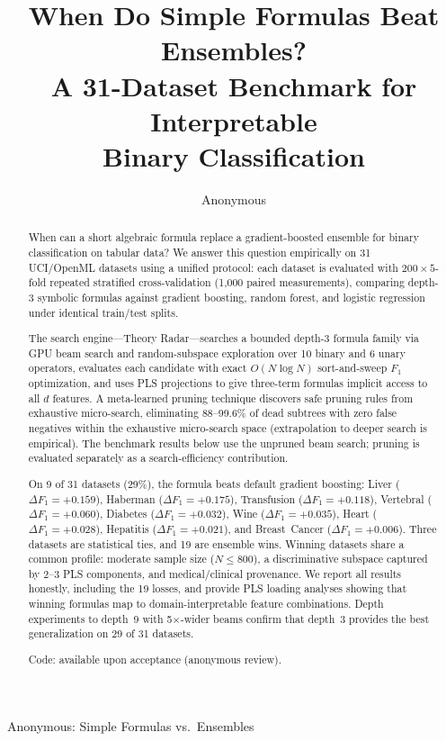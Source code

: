\documentclass[journal]{IEEEtran}
\begin{document}
\title{When Do Simple Formulas Beat Ensembles?\\
A 31-Dataset Benchmark for Interpretable\\Binary Classification}

\author{Anonymous}

{Anonymous: Simple Formulas vs.\ Ensembles}

\maketitle

\begin{abstract}
When can a short algebraic formula replace a gradient-boosted
ensemble for binary classification on tabular data?  We answer this
question empirically on 31 UCI/OpenML datasets using a unified
protocol: each dataset is evaluated with $200 \times 5$-fold
repeated stratified cross-validation (1{,}000 paired measurements),
comparing depth-3 symbolic formulas against gradient boosting,
random forest, and logistic regression under identical train/test
splits.

The search engine---Theory Radar---searches a bounded depth-3
formula family via GPU beam search and random-subspace exploration
over 10 binary and 6 unary operators, evaluates each candidate with
exact $O(N \log N)$ sort-and-sweep $F_1$ optimization, and uses PLS
projections to give three-term formulas implicit access to all $d$
features.  A meta-learned pruning
technique discovers safe pruning rules from exhaustive micro-search,
eliminating 88--99.6\% of dead subtrees with zero false negatives
within the exhaustive micro-search space (extrapolation to deeper
search is empirical).  The benchmark results below use the unpruned
beam search; pruning is evaluated separately as a search-efficiency
contribution.

On 9 of 31 datasets (29\%), the formula beats default
gradient boosting: Liver ($\Delta F_1 = {+}0.159$), Haberman
($\Delta F_1 = {+}0.175$), Transfusion ($\Delta F_1 = {+}0.118$),
Vertebral ($\Delta F_1 = {+}0.060$), Diabetes
($\Delta F_1 = {+}0.032$), Wine ($\Delta F_1 = {+}0.035$), Heart
($\Delta F_1 = {+}0.028$), Hepatitis ($\Delta F_1 = {+}0.021$),
and Breast~Cancer ($\Delta F_1 = {+}0.006$).  Three datasets are
statistical ties, and 19 are ensemble wins.  Winning datasets share
a common profile: moderate sample size ($N \leq 800$), a
discriminative subspace captured by 2--3 PLS components, and
medical/clinical provenance.  We report all results honestly,
including the 19 losses, and provide PLS loading analyses showing
that winning formulas map to domain-interpretable feature
combinations.  Depth experiments to depth~9 with 5$\times$-wider
beams confirm that depth~3 provides the best generalization on
29 of 31 datasets.

Code: available upon acceptance (anonymous review).
\end{abstract}
\end{document}
